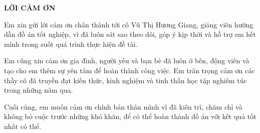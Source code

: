 \documentclass[../DoAn.tex]{subfiles}
\begin{document}
\begin{center}
    \Large{\textbf{LỜI CẢM ƠN}}\\
\end{center}
\vspace{1cm}
Em xin gửi lời cảm ơn chân thành tới cô Vũ Thị Hương Giang, giảng viên hướng dẫn đồ án tốt nghiệp, vì đã luôn sát sao theo dõi, góp ý kịp thời và hỗ trợ em hết mình trong suốt quá trình thực hiện đề tài.

Em cũng xin cảm ơn gia đình, người yêu và bạn bè đã luôn ở bên, động viên và tạo cho em thêm sự yên tâm để hoàn thành công việc. Em trân trọng cảm ơn các thầy cô đã truyền đạt kiến thức, kinh nghiệm và tinh thần học tập nghiêm túc trong những năm qua.

Cuối cùng, em muốn cảm ơn chính bản thân mình vì đã kiên trì, chăm chỉ và không bỏ cuộc trước những khó khăn, để có thể hoàn thành đồ án với kết quả tốt nhất có thể.
\end{document}
